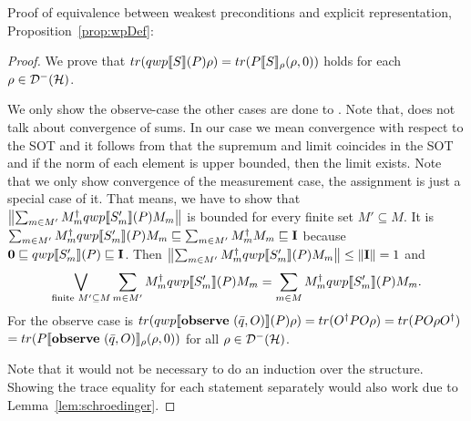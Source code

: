 \documentclass[a4paper,UKenglish,cleveref, autoref, thm-restate]{lipics-v2021}
\begin{document}
Proof of equivalence between weakest preconditions and explicit representation, Proposition~\ref{prop:wpDef}:
\begin{proof}
    We prove that $tr(qwp\llbracket S \rrbracket (P)\rho) = tr(P\llbracket S \rrbracket_{\rho}(\rho,0))$ holds for each $\rho \in \mathcal{D}^- (\mathcal{H})$. 

    We only show the observe-case the other cases are done to \cite{floydHoareLogic}. Note that, \cite{floydHoareLogic} does not talk about convergence of sums. In our case we mean convergence with respect to the SOT and it follows from \cite[Lem. 29]{heisenbergdualityUnruh} that the supremum and limit coincides in the SOT and if the norm of each element is upper bounded, then the limit exists. Note that we only show convergence of the measurement case, the assignment is just a special case of it.
    That means, we have to show that $\norm{\sum_{m \in M'} M_m^\dagger qwp\llbracket S'_m \rrbracket (P) M_m}$ is bounded for every finite set $M'\subseteq M$. It is $\sum_{m \in M'} M_m^\dagger qwp\llbracket S'_m \rrbracket (P) M_m \sqsubseteq \sum_{m \in M'} M_m^\dagger M_m \sqsubseteq \textbf{I}$ because $\mathbf{0} \sqsubseteq qwp\llbracket S'_m \rrbracket (P)\sqsubseteq \textbf{I}$. Then
    $\norm{\sum_{m \in M'} M_m^\dagger qwp\llbracket S'_m \rrbracket (P) M_m} \leq \norm{\textbf{I}} = 1$
    and \begin{align*}
        \bigvee_{\text{finite }M' \subseteq M} \sum_{m \in M'} M_m^\dagger qwp\llbracket S'_m \rrbracket (P) M_m = \sum_{m \in M} M_m^\dagger qwp\llbracket S'_m \rrbracket (P) M_m.
    \end{align*}
    For the observe case is $
            tr(qwp\llbracket \mathbf{observe } \text{ }(\Bar{q},O) \rrbracket (P)\rho) = tr(O^\dagger P O \rho) = tr(P O \rho O^\dagger ) $\\
            $= tr(P \llbracket \mathbf{observe } \text{ }(\Bar{q},O) \rrbracket_{\rho}(\rho,0))$
        for all $\rho \in \mathcal{D}^- (\mathcal{H})$.

Note that it would not be necessary to do an induction over the structure. Showing the trace equality for each statement separately would also work due to Lemma~\ref{lem:schroedinger}.
\end{proof}
\end{document}
